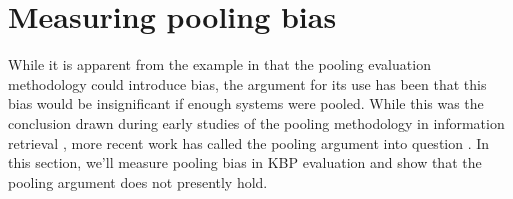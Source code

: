 \section{Measuring pooling bias}
\label{sec:analysis}

While it is apparent from the example in  that the pooling evaluation methodology could introduce bias, the argument for its use has been that this bias would be insignificant if enough systems were pooled.
While this was the conclusion drawn during early studies of the pooling methodology in information retrieval \citep{zobel1998reliable,voorhees1999overview}, more recent work has called the pooling argument into question \citep{buckley2004incomplete,buckley2007bias}.
In this section, we'll measure pooling bias in KBP evaluation and show that the pooling argument does not presently hold.

